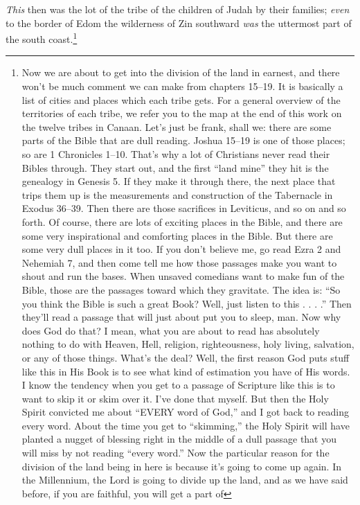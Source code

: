 \textcolor[rgb]{0.00,0.00,1.00}{\emph{This} then was the lot of the tribe of the children of Judah by their families; \emph{even} to the border of Edom the wilderness of Zin southward \emph{was} the uttermost part of the south coast.}\footnote{Now we are about to get into the division of the land in earnest, and there won’t be much
comment we can make from chapters 15--19. It
is basically a list of cities and places which each
tribe gets. For a general overview of the
territories of each tribe, we refer you to the map
at the end of this work on the twelve tribes in
Canaan.
Let’s just be frank, shall we: there are some
parts of the Bible that are dull reading. Joshua
15--19 is one of those places; so are 1
Chronicles 1--10. That’s why a lot of Christians
never read their Bibles through. They start out,
and the first “land mine” they hit is the
genealogy in Genesis 5. If they make it through
there, the next place that trips them up is the
measurements and construction of the
Tabernacle in Exodus 36--39. Then there are
those sacrifices in Leviticus, and so on and so
forth. Of course, there are lots of exciting places
in the Bible, and there are some very
inspirational and comforting places in the Bible.
But there are some very dull places in it too. If
you don’t believe me, go read Ezra 2 and
Nehemiah 7, and then come tell me how those
passages make you want to shout and run the
bases. When unsaved comedians want to make
fun of the Bible, those are the passages toward
which they gravitate. The idea is: “So you think
the Bible is such a great Book? Well, just listen
to this . . . .” Then they’ll read a passage that
will just about put you to sleep, man.
Now why does God do that? I mean, what
you are about to read has absolutely nothing to
do with Heaven, Hell, religion, righteousness,
holy living, salvation, or any of those things.
What’s the deal?
Well, the first reason God puts stuff like
this in His Book is to see what kind of
estimation you have of His words. I know the tendency when you get to a passage of Scripture like this is to want to skip it
or skim over it. I’ve done that myself. But then the Holy Spirit convicted me about “EVERY
word of God,” and I got back to reading every word. About the time you get to “skimming,”
the Holy Spirit will have planted a nugget of blessing right in the middle of a dull passage
that you will miss by not reading “every word.” Now the particular reason for the division
of the land being in here is because it’s going to come up again. In the Millennium, the Lord is
going to divide up the land, and as we have said before, if you are faithful, you will get a part of
}
